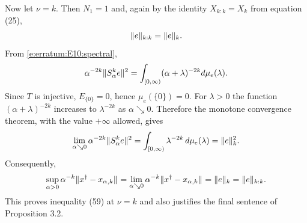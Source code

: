 Now let $\nu=k$.  Then $N_1=1$ and, again by the identity $X_{k:k}=X_k$
from equation (25),
\[
        \| e \|_{ k:k }=\| e \|_{ k } .
\]
From \eqref{e:erratum:E10:spectral},
\begin{align}
\label{e:erratum:E10:nuk}
        \alpha^{-2k}\| S_\alpha^k e \|_{  }^2
        =
        \int_{[0,\infty)}
        (\alpha+\lambda)^{-2k}
        d\mu_e(\lambda).
\end{align}
Since $T$ is injective, $E_{\{0\}}=0$, hence $\mu_e(\{0\})=0$.  For
$\lambda>0$ the function $(\alpha+\lambda)^{-2k}$ increases to
$\lambda^{-2k}$ as $\alpha\searrow0$.  Therefore the monotone convergence
theorem, with the value $+\infty$ allowed, gives
\[
        \lim_{\alpha\searrow0}
        \alpha^{-2k}\| S_\alpha^k e \|_{  }^2
        =
        \int_{[0,\infty)} \lambda^{-2k}\,d\mu_e(\lambda)
        =
        \| e \|_{ k }^2 .
\]
Consequently,
\[
        \sup_{\alpha>0}
        \alpha^{-k}\| x^\dag-x_{\alpha,k} \|_{  }
        =
        \lim_{\alpha\searrow0}
        \alpha^{-k}\| x^\dag-x_{\alpha,k} \|_{  }
        =
        \| e \|_{ k }
        =
        \| e \|_{ k:k } .
\]
This proves inequality (59) at $\nu=k$ and also justifies the final
sentence of Proposition 3.2.
